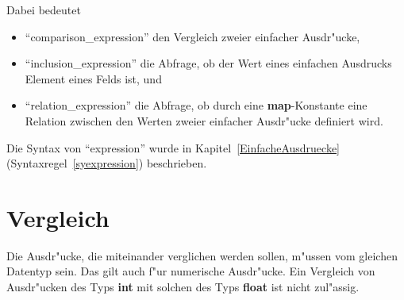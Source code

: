 \begin{center}
\end{center}

Dabei bedeutet
\begin{itemize} 
  \item ``comparison\_expression'' den  Vergleich zweier einfacher Ausdr"ucke,
  \item ``inclusion\_expression''  die Abfrage, ob der Wert eines einfachen Ausdrucks Element eines
	Felds ist, und 
  \item ``relation\_expression'' die Abfrage, ob durch eine {\bf map}-Konstante eine Relation zwischen
	den Werten zweier einfacher Ausdr"ucke definiert wird.
\end{itemize}
Die Syntax von ``expression'' wurde in Kapitel~\ref{EinfacheAusdruecke}
(Syntaxregel~\ref{syexpression}) beschrieben. 


\section{Vergleich}

Die Ausdr"ucke, die miteinander verglichen werden sollen, m"ussen vom
gleichen Datentyp sein. Das gilt auch f"ur numerische Ausdr"ucke. Ein
Vergleich von Ausdr"ucken des Typs {\bf int} mit solchen
des Typs {\bf float} ist nicht zul"assig.

